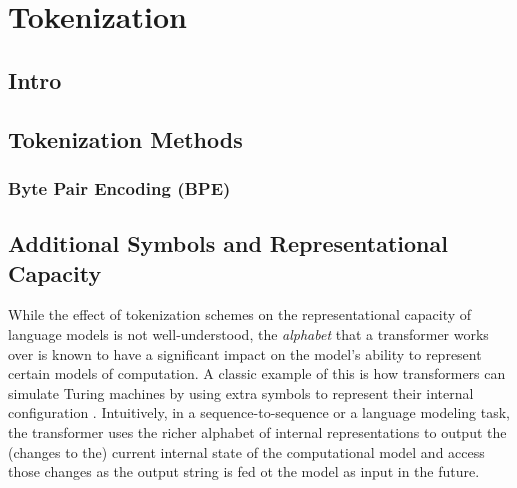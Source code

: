 %
\chapter{Tokenization}
%

\section{Intro}


\section{Tokenization Methods}

\subsection{Byte Pair Encoding (BPE)}


\section{Additional Symbols and Representational Capacity}

While the effect of tokenization schemes on the representational capacity of language models is not well-understood, the \emph{alphabet} that a transformer works over is known to have a significant impact on the model's ability to represent certain models of computation.
A classic example of this is how transformers can simulate Turing machines by using extra symbols to represent their internal configuration \citep{perez-etal-2021-turing}.
Intuitively, in a sequence-to-sequence or a language modeling task, the transformer uses the richer alphabet of internal representations to output the (changes to the) current internal state of the computational model and access those changes as the output string is fed ot the model as input in the future.

